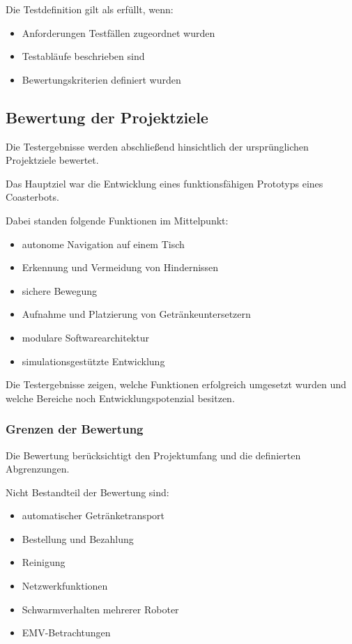 \documentclass[
  a4paper,
  12pt,
  DIV=12,        %
  parskip=half,  %
  headings=small %
]{scrartcl}
\theoremstyle{definition}
\providecommand{\tightlist}{%
  \setlength{\itemsep}{0pt}\setlength{\parskip}{0pt}}
\theoremstyle{definition}
\begin{document}
Die Testdefinition gilt als erfüllt, wenn:

\begin{itemize}
\tightlist
\item
  Anforderungen Testfällen zugeordnet wurden
\item
  Testabläufe beschrieben sind
\item
  Bewertungskriterien definiert wurden
\end{itemize}

\subsection{Bewertung der
Projektziele}\label{bewertung-der-projektziele}

Die Testergebnisse werden abschließend hinsichtlich der ursprünglichen
Projektziele bewertet.

Das Hauptziel war die Entwicklung eines funktionsfähigen Prototyps eines
Coasterbots.

Dabei standen folgende Funktionen im Mittelpunkt:

\begin{itemize}
\tightlist
\item
  autonome Navigation auf einem Tisch
\item
  Erkennung und Vermeidung von Hindernissen
\item
  sichere Bewegung
\item
  Aufnahme und Platzierung von Getränkeuntersetzern
\item
  modulare Softwarearchitektur
\item
  simulationsgestützte Entwicklung
\end{itemize}

Die Testergebnisse zeigen, welche Funktionen erfolgreich umgesetzt
wurden und welche Bereiche noch Entwicklungspotenzial besitzen.

\subsubsection{Grenzen der Bewertung}\label{grenzen-der-bewertung}

Die Bewertung berücksichtigt den Projektumfang und die definierten
Abgrenzungen.

Nicht Bestandteil der Bewertung sind:

\begin{itemize}
\tightlist
\item
  automatischer Getränketransport
\item
  Bestellung und Bezahlung
\item
  Reinigung
\item
  Netzwerkfunktionen
\item
  Schwarmverhalten mehrerer Roboter
\item
  EMV-Betrachtungen
\end{itemize}
\end{document}

